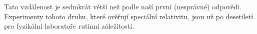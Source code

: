 \begin{mdframed}[style=mdexam]
\begin{example}
    {\centering
    \captionsetup{type=figure}
    \par}  

    Tato vzdálenost je sedmkrát větší než podle naší první (nesprávné) odpovědi. Experimenty tohoto
    druhu, které ověřují speciální relativitu, jsou už po desetiletí pro fyzikální laboratoře
    rutinní záležitostí.    
  \end{example}
\end{mdframed}